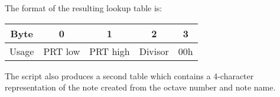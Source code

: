 The format of the resulting lookup table is:
\begin{nowordcount}
\begin{center}
\begin{tabular}{c | c | c | c | c}
Byte & 0 & 1 & 2 & 3 \\
\hline
Usage & PRT low & PRT high & Divisor & 00h \\
\end{tabular}
\end{center}
\end{nowordcount}

The script also produces a second table which contains a 4-character representation of the note 
created from the octave number and note name.
